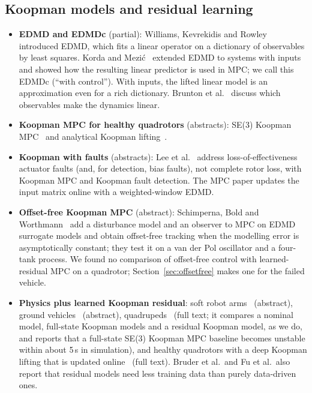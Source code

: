\subsection{Koopman models and residual learning}
\begin{itemize}
  \item \textbf{EDMD and EDMDc} (partial): Williams, Kevrekidis and Rowley~\cite{williams2015edmd} introduced EDMD, which fits a linear operator on a dictionary of observables by least squares. Korda and Mezi\'c~\cite{korda2018linear} extended EDMD to systems with inputs and showed how the resulting linear predictor is used in MPC; we call this EDMDc (``with control''). With inputs, the lifted linear model is an approximation even for a rich dictionary. Brunton et al.~\cite{brunton2016koopman} discuss which observables make the dynamics linear.
  \item \textbf{Koopman MPC for healthy quadrotors} (abstracts): SE(3) Koopman MPC~\cite{narayanan2023se3} and analytical Koopman lifting~\cite{martini2025kmpc}.
  \item \textbf{Koopman with faults} (abstracts): Lee et al.~\cite{lee2024koopmanftmpc,lee2024koopmanfdi} address loss-of-effectiveness actuator faults (and, for detection, bias faults), not complete rotor loss, with Koopman MPC and Koopman fault detection. The MPC paper updates the input matrix online with a weighted-window EDMD.
  \item \textbf{Offset-free Koopman MPC} (abstract): Schimperna, Bold and Worthmann~\cite{schimperna2025offsetfree} add a disturbance model and an observer to MPC on EDMD surrogate models and obtain offset-free tracking when the modelling error is asymptotically constant; they test it on a van der Pol oscillator and a four-tank process. We found no comparison of offset-free control with learned-residual MPC on a quadrotor; Section~\ref{sec:offsetfree} makes one for the failed vehicle.
  \item \textbf{Physics plus learned Koopman residual}: soft robot arms~\cite{bruder2025residual} (abstract), ground vehicles~\cite{fu2025residual} (abstract), quadrupeds~\cite{narayanan2026rkmpc} (full text; it compares a nominal model, full-state Koopman models and a residual Koopman model, as we do, and reports that a full-state SE(3) Koopman MPC baseline becomes unstable within about 5\,s in simulation), and healthy quadrotors with a deep Koopman lifting that is updated online~\cite{jin2025dekc} (full text). Bruder et al.\ and Fu et al.\ also report that residual models need less training data than purely data-driven ones.

\end{itemize}
